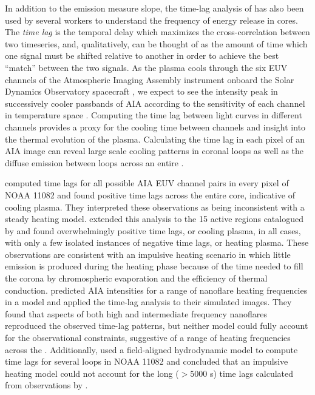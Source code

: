 In addition to the emission measure slope, the time-lag analysis of \citet{viall_evidence_2012} has also been used by several workers to understand the frequency of energy release in \AR{} cores. The \textit{time lag} is the temporal delay which maximizes the cross-correlation between two timeseries, and, qualitatively, can be thought of as the amount of time which one signal must be shifted relative to another in order to achieve the best ``match'' between the two signals. As the plasma cools through the six EUV channels of the Atmospheric Imaging Assembly instrument \citep[AIA,][]{lemen_atmospheric_2012} onboard the Solar Dynamics Observatory spacecraft \citep[SDO,][]{pesnell_solar_2012}, we expect to see the intensity peak in successively cooler passbands of AIA according to the sensitivity of each channel in temperature space \citep{viall_patterns_2011}. Computing the time lag between light curves in different channels provides a proxy for the cooling time between channels and insight into the thermal evolution of the plasma. Calculating the time lag in each pixel of an AIA image can reveal large scale cooling patterns in coronal loops as well as the diffuse emission between loops across an entire \AR{}.

\citet{viall_evidence_2012} computed time lags for all possible AIA EUV channel pairs in every pixel of \AR{} NOAA 11082 and found positive time lags across the entire \AR{} core, indicative of cooling plasma. They interpreted these observations as being inconsistent with a steady heating model. \citet{viall_survey_2017} extended this analysis to the 15 active regions catalogued by \citet{warren_systematic_2012} and found overwhelmingly positive time lags, or cooling plasma, in all cases, with only a few isolated instances of negative time lags, or heating plasma. These observations are consistent with an impulsive heating scenario in which little emission is produced during the heating phase because of the time needed to fill the corona by chromospheric evaporation and the efficiency of thermal conduction. \citet{bradshaw_patterns_2016} predicted AIA intensities for a range of nanoflare heating frequencies in a model \AR{} and applied the time-lag analysis to their simulated images. They found that aspects of both high and intermediate frequency nanoflares reproduced the observed time-lag patterns, but neither model could fully account for the observational constraints, suggestive of a range of heating frequencies across the \AR{}. Additionally, \citet{lionello_can_2016} used a field-aligned hydrodynamic model to compute time lags for several loops in NOAA 11082 and concluded that an impulsive heating model could not account for the long ($>5000$ s) time lags calculated from observations by \citet{viall_evidence_2012}.

